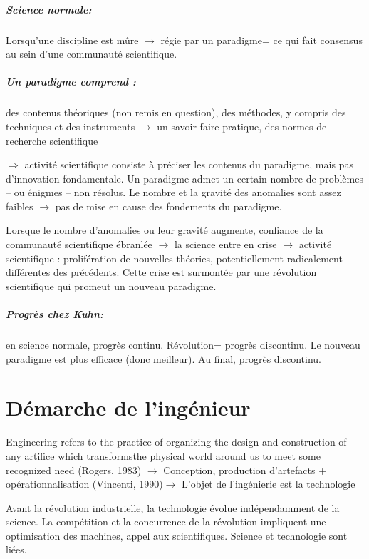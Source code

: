 \documentclass{report}
\begin{document}
	\paragraph{Science normale:} Lorsqu’une discipline est \og mûre \fg $\rightarrow$ régie par un paradigme= ce qui fait consensus au sein d’une communauté scientifique.
	
	\paragraph{Un paradigme comprend :} des contenus théoriques (non remis en question), des méthodes, y compris des techniques et des instruments $\rightarrow$ un savoir-faire pratique, des normes de recherche scientifique
	
	$\Rightarrow$ activité scientifique consiste à préciser les contenus du paradigme, mais pas d’innovation fondamentale. Un paradigme admet un certain nombre de problèmes – ou énigmes – non résolus. Le nombre et la gravité des anomalies sont assez faibles $\rightarrow$ pas de mise en cause des fondements du paradigme.
	
	Lorsque le nombre d’anomalies ou leur gravité augmente, confiance de la communauté scientifique ébranlée $\rightarrow$ la science entre en crise $\rightarrow$ activité scientifique : prolifération de nouvelles théories, potentiellement radicalement différentes des précédents. Cette crise est surmontée par une révolution scientifique qui promeut un nouveau paradigme.
	
	\paragraph{Progrès chez Kuhn:} en science normale, progrès continu. Révolution= progrès discontinu. Le nouveau paradigme est plus efficace (donc meilleur). Au final, progrès discontinu.
	
	\chapter{Démarche de l'ingénieur}
	
	\og Engineering refers to the practice of organizing the design and construction of any artifice which transformsthe physical world around us to meet some recognized need \fg (Rogers, 1983) $\rightarrow$ Conception, production d’artefacts + opérationnalisation (Vincenti, 1990)$\rightarrow$ L’objet de l’ingénierie est la technologie
	
	Avant la révolution industrielle, la technologie évolue indépendamment de la science. La compétition et la concurrence de la révolution impliquent une optimisation des machines, appel aux scientifiques. Science et technologie sont liées.
	
\end{document}

